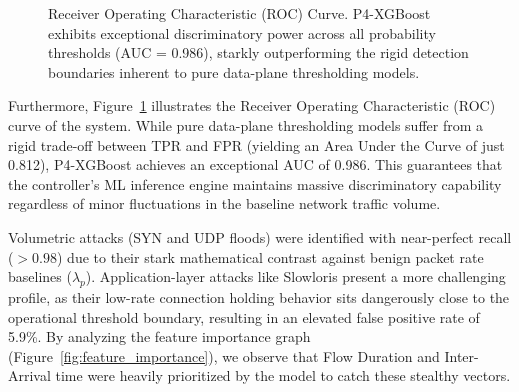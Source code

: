 \documentclass[sigconf, nonacm]{acmart}
\begin{document}
\begin{figure}[htbp]
\centering
{}
\caption{Receiver Operating Characteristic (ROC) Curve. P4-XGBoost exhibits exceptional discriminatory power across all probability thresholds (AUC = 0.986), starkly outperforming the rigid detection boundaries inherent to pure data-plane thresholding models.}
\label{fig:roc_curve}
\end{figure}

Furthermore, Figure~\ref{fig:roc_curve} illustrates the Receiver Operating Characteristic (ROC) curve of the system. While pure data-plane thresholding models suffer from a rigid trade-off between TPR and FPR (yielding an Area Under the Curve of just 0.812), P4-XGBoost achieves an exceptional AUC of 0.986. This guarantees that the controller's ML inference engine maintains massive discriminatory capability regardless of minor fluctuations in the baseline network traffic volume.

Volumetric attacks (SYN and UDP floods) were identified with near-perfect recall ($>0.98$) due to their stark mathematical contrast against benign packet rate baselines ($\lambda_p$). Application-layer attacks like Slowloris present a more challenging profile, as their low-rate connection holding behavior sits dangerously close to the operational threshold boundary, resulting in an elevated false positive rate of 5.9\%. By analyzing the feature importance graph (Figure~\ref{fig:feature_importance}), we observe that Flow Duration and Inter-Arrival time were heavily prioritized by the model to catch these stealthy vectors.
\end{document}
